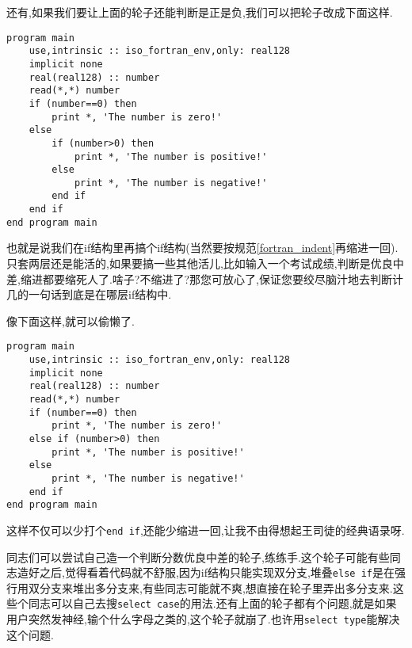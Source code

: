 还有,如果我们要让上面的轮子还能判断是正是负,我们可以把轮子改成下面这样.
\begin{lstlisting}
program main
    use,intrinsic :: iso_fortran_env,only: real128
    implicit none
    real(real128) :: number
    read(*,*) number
    if (number==0) then
        print *, 'The number is zero!'
    else
        if (number>0) then
            print *, 'The number is positive!'
        else
            print *, 'The number is negative!'
        end if
    end if
end program main
\end{lstlisting}
也就是说我们在if结构里再搞个if结构(当然要按规范\ref{fortran_indent}再缩进一回).只套两层还是能活的,如果要搞一些其他活儿,比如输入一个考试成绩,判断是优良中差,缩进都要缩死人了.啥子?不缩进了?那您可放心了,保证您要绞尽脑汁地去判断计几的一句话到底是在哪层if结构中.

像下面这样,就可以偷懒了.
\begin{lstlisting}
program main
    use,intrinsic :: iso_fortran_env,only: real128
    implicit none
    real(real128) :: number
    read(*,*) number
    if (number==0) then
        print *, 'The number is zero!'
    else if (number>0) then
        print *, 'The number is positive!'
    else
        print *, 'The number is negative!'
    end if
end program main
\end{lstlisting}
这样不仅可以少打个\texttt{end if},还能少缩进一回,让我不由得想起王司徒的经典语录呀.

同志们可以尝试自己造一个判断分数优良中差的轮子,练练手.这个轮子可能有些同志造好之后,觉得看着代码就不舒服,因为if结构只能实现双分支,堆叠\texttt{else if}是在强行用双分支来堆出多分支来,有些同志可能就不爽,想直接在轮子里弄出多分支来.这些个同志可以自己去搜\texttt{select case}的用法.还有上面的轮子都有个问题,就是如果用户突然发神经,输个什么字母之类的,这个轮子就崩了.也许用\texttt{select type}能解决这个问题.

